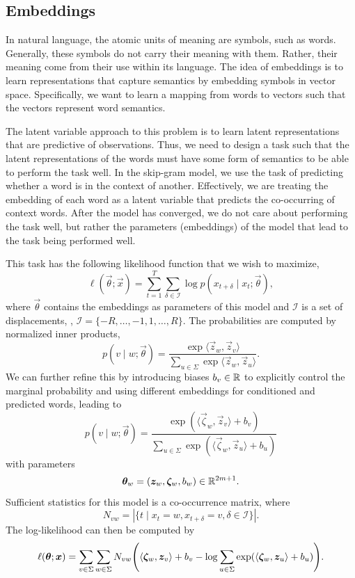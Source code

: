\subsection{Embeddings}

In natural language, the atomic units of meaning are symbols, such as words. Generally, these
symbols do not carry their meaning with them. Rather, their meaning come from their use within its
language. The idea of embeddings is to learn representations that capture semantics by embedding
symbols in vector space. Specifically, we want to learn a mapping from words to vectors such that
the vectors represent word semantics.

The latent variable approach to this problem is to learn latent representations that are predictive
of observations. Thus, we need to design a task such that the latent representations of the words
must have some form of semantics to be able to perform the task well. In the skip-gram model, we
use the task of predicting whether a word is in the context of another. Effectively, we are treating the embedding of
each word as a latent variable that predicts the co-occurring of context words. After the model has
converged, we do not care about performing the task well, but rather the parameters (embeddings) of
the model that lead to the task being performed well.

This task has the following likelihood function that we wish to maximize, \[
    \ell(\vec{\theta}; \vec{x}) = \sum_{t=1}^{T} \sum_{\delta \in \mathcal{I}} \log p(x_{t+\delta} \mid x_t; \vec{\theta}),
\]
where $\vec{\theta}$ contains the embeddings as parameters of this model and $\mathcal{I}$ is a set
of displacements, \eg, $\mathcal{I} = \{ -R, \ldots, -1, 1, \ldots, R \}$. The probabilities are
computed by normalized inner products, \[
    p(v \mid w; \vec{\theta}) = \frac{\exp \langle \vec{z}_w, \vec{z}_v \rangle}{\sum_{u \in \Sigma} \exp \langle \vec{z}_w, \vec{z}_u \rangle}.
\]
We can further refine this by introducing biases $b_v \in \mathbb{R}$ to explicitly control the marginal
probability and using different embeddings for conditioned and predicted words, leading to \[
    p(v \mid w; \vec{\theta}) = \frac{\exp(\langle \vec{\zeta}_w, \vec{z}_v \rangle + b_v)}{\sum_{u \in \Sigma} \exp(\langle \vec{\zeta}_w, \vec{z}_u \rangle + b_u)}
\]
with parameters \[
    \bm{\theta}_w = (\bm{z}_w, \bm{\zeta}_w, b_w) \in \mathbb{R}^{2m+1}.
\]
Sufficient statistics for this model is a co-occurrence matrix, where \[
    N_{vw} = | \{ t \mid x_t = w, x_{t+\delta}=v, \delta \in \mathcal{I} \} |.
\]
The log-likelihood can then be computed by \[
    \ell(\vec{\theta}; \vec{x}) = \sum_{v \in \Sigma} \sum_{w \in \Sigma} N_{vw} \lft( \langle \vec{\zeta}_w, \vec{z}_v \rangle + b_v - \log \sum_{u \in \Sigma} \exp (\langle \vec{\zeta}_w, \vec{z}_u \rangle + b_u) \rgt).
\]


